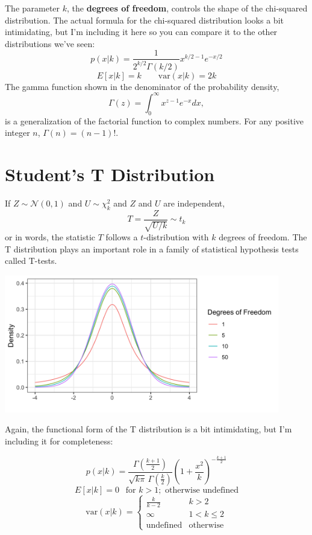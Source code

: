The parameter $k$, the \textbf{degrees of freedom}, controls the shape of the chi-squared distribution. The actual formula for the chi-squared distribution looks a bit intimidating, but I'm including it here so you can compare it to the other distributions we've seen:
$$ p(x|k) = \frac{1}{2^{k/2} \Gamma(k/2)} x^{k/2 - 1} e^{-x/2} $$
$$ E[x | k] = k \qquad \text{var}(x | k) = 2k $$ 
The gamma function shown in the denominator of the probability density,
$$ \Gamma(z) = \int_0^{\infty} x^{z-1} e^{-x} dx, $$
is a generalization of the factorial function to complex numbers. For any positive integer $n$, $\Gamma(n) = (n-1)!$. 

\section{Student's T Distribution \label{sect:tdist}}

If $Z \sim \mathcal{N}(0, 1)$ and $U \sim \chi_k^2$ and $Z$ and $U$ are independent, 
$$ T = \frac{Z}{\sqrt{U/k}} \sim t_k $$
or in words, the statistic $T$ follows a $t$-distribution with $k$ degrees of freedom. The T distribution plays an important role in a family of statistical hypothesis tests called T-tests. 

\begin{center}
\includegraphics[width=0.9\textwidth]{img/hyp-example-t-distribution.png}
\end{center}

Again, the functional form of the T distribution is a bit intimidating, but I'm including it for completeness:

$$ p(x|k) = \frac{\Gamma \left(\frac{k+1}{2} \right)} {\sqrt{k\pi}\,\Gamma \left(\frac{k}{2} \right)} \left(1+\frac{x^2}{k} \right)^{-\frac{k+1}{2}} $$
$$ E[x|k] = 0~~\text{ for }k>1; \text{ otherwise undefined} $$
$$ \text{var}(x|k) = \left\{ \begin{array}{cl} \frac{k}{k-2} & k>2 \\
                                               \infty & 1 < k \leq 2 \\
                                               \text{undefined} & \text{otherwise} \end{array} \right. $$

